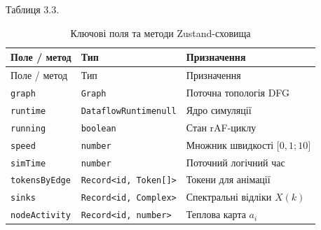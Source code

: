 \documentclass[
]{article}
\begin{document}
Таблиця 3.3.

\begin{longtable}[]{@{}
  >{\raggedright\arraybackslash}p{}
  >{\raggedright\arraybackslash}p{}
  >{\raggedright\arraybackslash}p{}@{}}
\caption{Ключові поля та методи Zustand-сховища}\tabularnewline
\toprule\noalign{}
\begin{minipage}[b]{\linewidth}\raggedright
Поле / метод
\end{minipage} & \begin{minipage}[b]{\linewidth}\raggedright
Тип
\end{minipage} & \begin{minipage}[b]{\linewidth}\raggedright
Призначення
\end{minipage} \\
\midrule\noalign{}
\endfirsthead
\toprule\noalign{}
\begin{minipage}[b]{\linewidth}\raggedright
Поле / метод
\end{minipage} & \begin{minipage}[b]{\linewidth}\raggedright
Тип
\end{minipage} & \begin{minipage}[b]{\linewidth}\raggedright
Призначення
\end{minipage} \\
\midrule\noalign{}
\endhead
\bottomrule\noalign{}
\endlastfoot
\texttt{graph} & \texttt{Graph} & Поточна топологія DFG \\
\texttt{runtime} & \texttt{DataflowRuntimenull} & Ядро симуляції \\
\texttt{running} & \texttt{boolean} & Стан rAF-циклу \\
\texttt{speed} & \texttt{number} & Множник швидкості
\(\lbrack 0,1;10\rbrack\) \\
\texttt{simTime} & \texttt{number} & Поточний логічний час \\
\texttt{tokensByEdge} &
\texttt{Record}\texttt{\textless{}}\texttt{id}\texttt{,\ }\texttt{Token}\texttt{{[}{]}\textgreater{}}
& Токени для анімації \\
\texttt{sinks} &
\texttt{Record}\texttt{\textless{}}\texttt{id}\texttt{,\ }\texttt{Complex}\texttt{\textgreater{}}
& Спектральні відліки \(X(k)\) \\
\texttt{nodeActivity} &
\texttt{Record}\texttt{\textless{}}\texttt{id}\texttt{,\ }\texttt{number}\texttt{\textgreater{}}
& Теплова карта \(a_{i}\) \\

\end{longtable}
\end{document}
